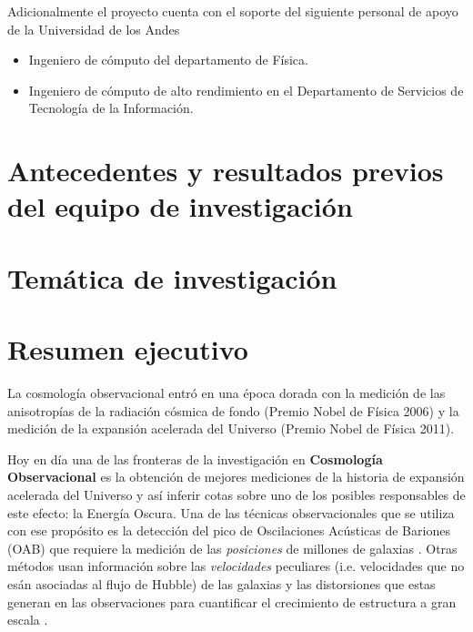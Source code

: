 \documentclass[12pt]{article}
\begin{document}
\noindent
Adicionalmente el proyecto cuenta con el soporte del siguiente
personal de apoyo de la Universidad de los Andes 

\begin{itemize}
\item{Ingeniero de c\'omputo del departamento de F\'isica.}
\item{Ingeniero de c\'omputo de alto rendimiento en el Departamento de Servicios de Tecnolog\'ia de la Informaci\'on}.
\end{itemize}

\section{Antecedentes y resultados previos del equipo de
  investigaci\'on} 

\section{Tem\'atica de investigaci\'on}


\section{Resumen ejecutivo}

La cosmología observacional entró en una época dorada con la medición
de las anisotropías de la radiación cósmica de fondo (Premio Nobel de
Física 2006) y la medición de la expansión acelerada del Universo
(Premio Nobel de Física 2011). 

Hoy en d\'ia una de las fronteras de la investigación en {\bf Cosmología
Observacional} es la obtenci\'on de mejores mediciones de la historia de
expansión acelerada del Universo y as\'i inferir cotas sobre uno de
los posibles responsables de este efecto: la Energ\'ia Oscura.  Una de
las t\'ecnicas observacionales que se utiliza con ese prop\'osito es
la detecci\'on del pico de Oscilaciones Ac\'usticas de
Bariones (OAB) que requiere la medici\'on de las \emph{posiciones} de
millones de galaxias \cite{Eisenstein2005}. Otras m\'etodos usan
informaci\'on sobre las \emph{velocidades} peculiares (i.e. velocidades
que no es\'an asociadas al flujo de Hubble) de las galaxias y las distorsiones
que estas generan en las observaciones para cuantificar el crecimiento
de estructura a gran escala \cite{Scoccimarro2004}.
\end{document}
